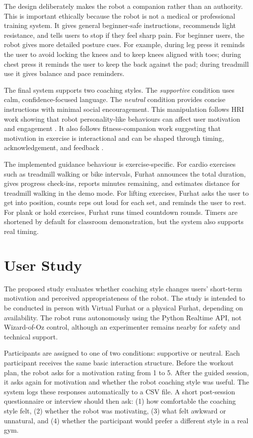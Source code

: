 \documentclass[conference, onecolumn]{IEEEtran}
\begin{document}
The design deliberately makes the robot a companion rather than an authority. This is important ethically because the robot is not a medical or professional training system. It gives general beginner-safe instructions, recommends light resistance, and tells users to stop if they feel sharp pain. For beginner users, the robot gives more detailed posture cues. For example, during leg press it reminds the user to avoid locking the knees and to keep knees aligned with toes; during chest press it reminds the user to keep the back against the pad; during treadmill use it gives balance and pace reminders.

The final system supports two coaching styles. The \emph{supportive} condition uses calm, confidence-focused language. The \emph{neutral} condition provides concise instructions with minimal social encouragement. This manipulation follows HRI work showing that robot personality-like behaviours can affect user motivation and engagement \cite{andrist2015look}. It also follows fitness-companion work suggesting that motivation in exercise is interactional and can be shaped through timing, acknowledgement, and feedback \cite{sussenbach2014robot}.

The implemented guidance behaviour is exercise-specific. For cardio exercises such as treadmill walking or bike intervals, Furhat announces the total duration, gives progress check-ins, reports minutes remaining, and estimates distance for treadmill walking in the demo mode. For lifting exercises, Furhat asks the user to get into position, counts reps out loud for each set, and reminds the user to rest. For plank or hold exercises, Furhat runs timed countdown rounds. Timers are shortened by default for classroom demonstration, but the system also supports real timing.

\section{User Study}
The proposed study evaluates whether coaching style changes users' short-term motivation and perceived appropriateness of the robot. The study is intended to be conducted in person with Virtual Furhat or a physical Furhat, depending on availability. The robot runs autonomously using the Python Realtime API, not Wizard-of-Oz control, although an experimenter remains nearby for safety and technical support.

Participants are assigned to one of two conditions: supportive or neutral. Each participant receives the same basic interaction structure. Before the workout plan, the robot asks for a motivation rating from 1 to 5. After the guided session, it asks again for motivation and whether the robot coaching style was useful. The system logs these responses automatically to a CSV file. A short post-session questionnaire or interview should then ask: (1) how comfortable the coaching style felt, (2) whether the robot was motivating, (3) what felt awkward or unnatural, and (4) whether the participant would prefer a different style in a real gym.
\end{document}
